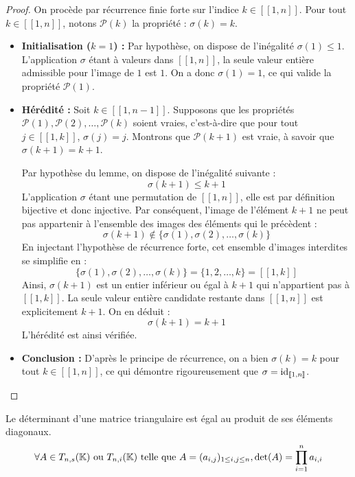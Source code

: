 \documentclass[12pt, a4paper]{report}
\begin{document}
\begin{proof}
    On procède par récurrence finie forte sur l'indice $k \in [\![1,n]\!]$. Pour tout $k \in [\![1,n]\!]$, notons $\mathcal{P}(k)$ la propriété : $\sigma(k) = k$.

    \begin{itemize}
        \item \textbf{Initialisation ($k=1$) :}
        Par hypothèse, on dispose de l'inégalité $\sigma(1) \le 1$. L'application $\sigma$ étant à valeurs dans $[\![1,n]\!]$, la seule valeur entière admissible pour l'image de $1$ est $1$. On a donc $\sigma(1) = 1$, ce qui valide la propriété $\mathcal{P}(1)$.

        \item \textbf{Hérédité :}
        Soit $k \in [\![1,n-1]\!]$. Supposons que les propriétés $\mathcal{P}(1), \mathcal{P}(2), \dots, \mathcal{P}(k)$ soient vraies, c'est-à-dire que pour tout $j \in [\![1,k]\!]$, $\sigma(j) = j$. Montrons que $\mathcal{P}(k+1)$ est vraie, à savoir que $\sigma(k+1) = k+1$.

        Par hypothèse du lemme, on dispose de l'inégalité suivante :
        $$\sigma(k+1) \le k+1$$
        L'application $\sigma$ étant une permutation de $[\![1,n]\!]$, elle est par définition bijective et donc injective. Par conséquent, l'image de l'élément $k+1$ ne peut pas appartenir à l'ensemble des images des éléments qui le précèdent :
        $$\sigma(k+1) \notin \{\sigma(1), \sigma(2), \dots, \sigma(k)\}$$
        En injectant l'hypothèse de récurrence forte, cet ensemble d'images interdites se simplifie en :
        $$\{\sigma(1), \sigma(2), \dots, \sigma(k)\} = \{1, 2, \dots, k\} = [\![1,k]\!]$$
        Ainsi, $\sigma(k+1)$ est un entier inférieur ou égal à $k+1$ qui n'appartient pas à $[\![1,k]\!]$. La seule valeur entière candidate restante dans $[\![1,n]\!]$ est explicitement $k+1$. On en déduit :
        $$\sigma(k+1) = k+1$$
        L'hérédité est ainsi vérifiée.

        \item \textbf{Conclusion :}
        D'après le principe de récurrence, on a bien $\sigma(k) = k$ pour tout $k \in [\![1,n]\!]$, ce qui démontre rigoureusement que $\sigma = \mathrm{id}_{[\![1,n]\!]}$.
    \end{itemize}
\end{proof}

\begin{property}
    Le déterminant d'une matrice triangulaire est égal au produit de ses éléments diagonaux.
    $$\forall A \in T_{n,s}(\mathbb{K}) \text{ ou } T_{n,i}(\mathbb{K}) \text{ telle que } A = (a_{i,j})_{1 \le i,j \le n}, \det(A) = \prod_{i=1}^{n} a_{i,i}$$
\end{property}
\end{document}
